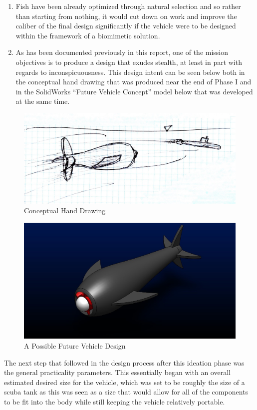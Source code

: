 \documentclass{report}
\begin{document}
\begin{enumerate}
\item Fish have been already optimized through natural selection and so rather than starting from nothing, it would cut down on work and improve the caliber of the final design significantly if the vehicle were to be designed within the framework of a biomimetic solution.
\item As has been documented previously in this report, one of the mission objectives is to produce a design that exudes stealth, at least in part with regards to inconspicuousness.
This design intent can be seen below both in the conceptual hand drawing that was produced near the end of Phase I and in the SolidWorks “Future Vehicle Concept” model below that was developed at the same time.
\end{enumerate}
\begin{figure}[H]
\centering
\includegraphics[width=12cm]{concept}
\caption{Conceptual Hand Drawing}
\end{figure}
\begin{figure}[H]
\centering
\includegraphics[width=12cm]{future}
\caption{A Possible Future Vehicle Design}
\end{figure}
The next step that followed in the design process after this ideation phase was the general practicality parameters.  This essentially began with an overall estimated desired size for the vehicle, which was set to be roughly the size of a scuba tank as this was seen as a size that would allow for all of the components to be fit into the body while still keeping the vehicle relatively portable.\par
\end{document}
